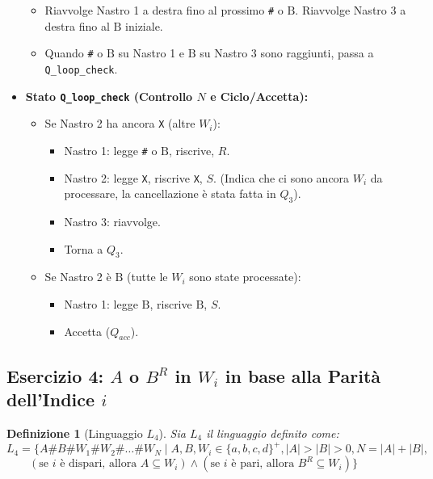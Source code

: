 \documentclass[a4paper]{article}
\newtheorem{definition}{Definizione}
\newcommand{\B}{\text{B}} %
\begin{document}
\begin{itemize}
\begin{itemize}
            \item Riavvolge Nastro 1 a destra fino al prossimo \texttt{\#} o $\B$. Riavvolge Nastro 3 a destra fino al $\B$ iniziale.
            \item Quando \texttt{\#} o $\B$ su Nastro 1 e $\B$ su Nastro 3 sono raggiunti, passa a \texttt{Q\_{loop\_check}}.
        \end{itemize}
    \item \textbf{Stato \texttt{Q\_{loop\_check}} (Controllo $N$ e Ciclo/Accetta):}
        \begin{itemize}
            \item Se Nastro 2 ha ancora \texttt{X} (altre $W_i$):
                \begin{itemize}
                    \item Nastro 1: legge \texttt{\#} o $\B$, riscrive, $R$.
                    \item Nastro 2: legge \texttt{X}, riscrive \texttt{X}, $S$. (Indica che ci sono ancora $W_i$ da processare, la cancellazione è stata fatta in $Q_3$).
                    \item Nastro 3: riavvolge.
                    \item Torna a $Q_3$.
                \end{itemize}
            \item Se Nastro 2 è $\B$ (tutte le $W_i$ sono state processate):
                \begin{itemize}
                    \item Nastro 1: legge $\B$, riscrive $\B$, $S$.
                    \item Accetta ($Q_{acc}$).
                \end{itemize}
        \end{itemize}
\end{itemize}

\subsection{Esercizio 4: $A$ o $B^R$ in $W_i$ in base alla Parità dell'Indice $i$}

\begin{definition}[Linguaggio $L_4$]
Sia $L_4$ il linguaggio definito come:
$L_4 = \{A\texttt{\#}B\texttt{\#}W_1 \texttt{\#} W_2 \texttt{\#} \dots \texttt{\#} W_N \mid A, B, W_i \in \{a,b,c,d\}^+, |A| > |B| > 0, N = |A| + |B|, $
$\qquad (\text{se } i \text{ è dispari, allora } A \subseteq W_i) \land (\text{se } i \text{ è pari, allora } B^R \subseteq W_i) \}$
\end{definition}
\end{document}
